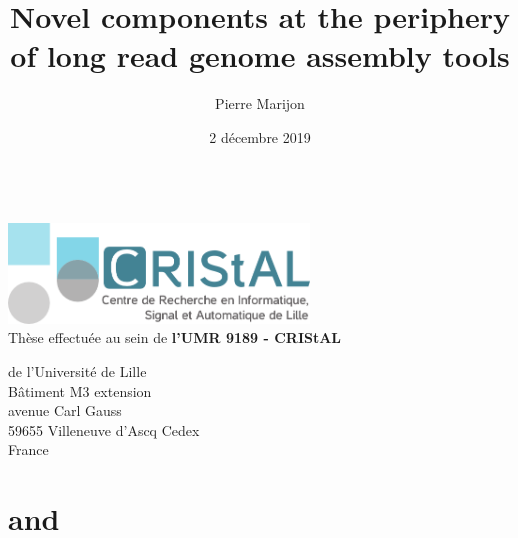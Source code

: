 \documentclass{thesis}
\title{Novel components at the periphery of long read genome assembly tools} %
\author{Pierre Marijon}
\date{2 décembre 2019}
\begin{document}
\maketitle
\clearpage

\listoftodos

\begin{center}
~\vspace*{\fill}\\
\thispagestyle{plain}
\includegraphics[width=0.6\textwidth]{assets/images/logo_cristal}\vspace{0.5cm}\\
Thèse effectuée au sein de \textbf{l'UMR 9189 - CRIStAL}\par 
 de l'Université de Lille\\
Bâtiment M3 extension\\
avenue Carl Gauss\\
59655 Villeneuve d'Ascq Cedex\\
France
\vspace*{\fill}
\clearpage
\end{center}

\frontmatter



\tableofcontents

\mainmatter
















\appendix

\chapter{\knot}


\chapter{\yacrd and \fpa}


\newpage
\backmatter

\end{document}
